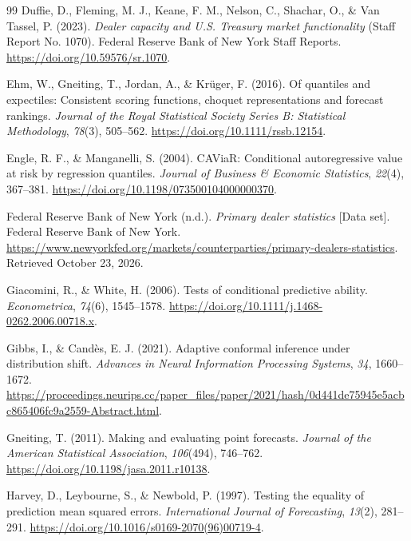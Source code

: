 \begin{thebibliography}{99}
 Duffie, D., Fleming, M. J., Keane, F. M., Nelson, C., Shachar, O., \& Van Tassel, P. (2023). \emph{Dealer capacity and U.S. Treasury market functionality} (Staff Report No. 1070). Federal Reserve Bank of New York Staff Reports. \url{https://doi.org/10.59576/sr.1070}.

 Ehm, W., Gneiting, T., Jordan, A., \& Krüger, F. (2016). Of quantiles and expectiles: Consistent scoring functions, choquet representations and forecast rankings. \emph{Journal of the Royal Statistical Society Series B: Statistical Methodology}, \emph{78}(3), 505--562. \url{https://doi.org/10.1111/rssb.12154}.

 Engle, R. F., \& Manganelli, S. (2004). CAViaR: Conditional autoregressive value at risk by regression quantiles. \emph{Journal of Business \& Economic Statistics}, \emph{22}(4), 367--381. \url{https://doi.org/10.1198/073500104000000370}.

 Federal Reserve Bank of New York (n.d.). \emph{Primary dealer statistics} [Data set]. Federal Reserve Bank of New York. \url{https://www.newyorkfed.org/markets/counterparties/primary-dealers-statistics}. Retrieved October 23, 2026.

 Giacomini, R., \& White, H. (2006). Tests of conditional predictive ability. \emph{Econometrica}, \emph{74}(6), 1545--1578. \url{https://doi.org/10.1111/j.1468-0262.2006.00718.x}.

 Gibbs, I., \& Candès, E. J. (2021). Adaptive conformal inference under distribution shift. \emph{Advances in Neural Information Processing Systems}, \emph{34}, 1660--1672. \url{https://proceedings.neurips.cc/paper_files/paper/2021/hash/0d441de75945e5acbc865406fc9a2559-Abstract.html}.

 Gneiting, T. (2011). Making and evaluating point forecasts. \emph{Journal of the American Statistical Association}, \emph{106}(494), 746--762. \url{https://doi.org/10.1198/jasa.2011.r10138}.

 Harvey, D., Leybourne, S., \& Newbold, P. (1997). Testing the equality of prediction mean squared errors. \emph{International Journal of Forecasting}, \emph{13}(2), 281--291. \url{https://doi.org/10.1016/s0169-2070(96)00719-4}.


\end{thebibliography}
